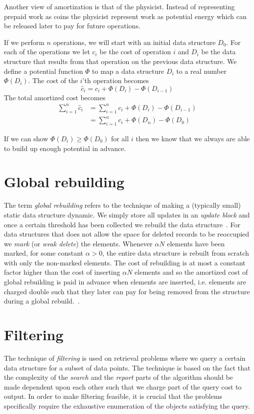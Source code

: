 \documentclass[twoside,11pt,openright]{report}
\begin{document}
Another view of amortization is that of the physicist. Instead of representing prepaid work as coins the physicist represent work as potential energy which can be released later to pay for future operations.

If we perform $n$ operations, we will start with an initial data structure $D_0$. For each of the operations we let $c_i$ be the cost of operation $i$ and $D_i$ be the data structure that results from that operation on the previous data structure. We define a potential function $\Phi$ to map a data structure $D_i$ to a real number $\Phi(D_i)$. The cost of the $i$'th operation becomes
$$\hat{c}_i = c_i + \Phi(D_i) - \Phi(D_{i-1})$$
The total amortized cost becomes
\begin{align*}
\sum_{i=1}^n \hat{c}_i &= \sum_{i=1}^n c_i + \Phi(D_i) - \Phi(D_{i-1}) \\
&= \sum_{i=1}^n c_i + \Phi(D_n) - \Phi(D_{0})
\end{align*}

If we can show $\Phi(D_i) \geq \Phi(D_0)$ for all $i$ then we know that we always are able to build up enough potential in advance.

\section{Global rebuilding}
\label{sec:prelim_global_rebuilding}
The term \textit{global rebuilding} refers to the technique of making a (typically small) static data structure dynamic. We simply store all updates in an \textit{update block} and once a certain threshold has been collected we rebuild the data structure~\cite{ionote}. For data structures that does not allow the space for deleted records to be reoccupied we \textit{mark} (or \textit{weak delete}) the elements. Whenever $\alpha N$ elements have been marked, for some constant $\alpha > 0$, the entire data structure is rebuilt from scratch with only the non-marked elements. The cost of rebuilding is at most a constant factor higher than the cost of inserting $\alpha N$ elements and so the amortized cost of global rebuilding is paid in advance when elements are inserted, i.e. elements are charged double such that they later can pay for being removed from the structure during a global rebuild.~\cite{Meyer:2003/AMH/1744652}.

\section{Filtering}
\label{sec:filtering}
The technique of \textit{filtering} is used on retrieval problems where we query a certain data structure for a subset of data points. The technique is based on the fact that the complexity of the \textit{search} and the \textit{report} parts of the algorithm should be made dependent upon each other such that we charge part of the query cost to output. In order to make filtering feasible, it is crucial that the problems specifically require the exhaustive enumeration of the objects satisfying the query.
\end{document}

